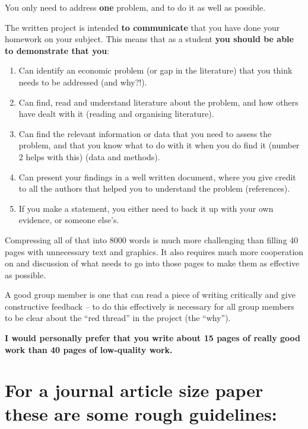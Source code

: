 \documentclass[
]{book}
\begin{document}
You only need to address \textbf{one} problem, and to do it as well as
possible.

The written project is intended \textbf{to communicate} that you have done
your homework on your subject. This means that as a student \textbf{you should
be able to demonstrate that you}:

\begin{enumerate}
\def\labelenumi{\arabic{enumi}.}
\item
  Can identify an economic problem (or gap in the literature) that you
  think needs to be addressed (and why?!).
\item
  Can find, read and understand literature about the problem, and how
  others have dealt with it (reading and organising literature).
\item
  Can find the relevant information or data that you need to assess
  the problem, and that you know what to do with it when you do find
  it (number 2 helps with this) (data and methods).
\item
  Can present your findings in a well written document, where you give
  credit to all the authors that helped you to understand the
  problem (references).
\item
  If you make a statement, you either need to back it up with your own
  evidence, or someone else's.
\end{enumerate}

Compressing all of that into 8000 words is much more challenging than
filling 40 pages with unnecessary text and graphics. It also requires
much more cooperation on and discussion of what needs to go into those
pages to make them as effective as possible.

A good group member is one that can read a piece of writing critically
and give constructive feedback -- to do this effectively is necessary
for all group members to be clear about the ``red thread'' in the project
(the ``why'').

\textbf{I would personally prefer that you write about 15 pages of really good
work than 40 pages of low-quality work.}

\hypertarget{for-a-journal-article-size-paper-these-are-some-rough-guidelines}{%
\section{For a journal article size paper these are some rough guidelines:}\label{for-a-journal-article-size-paper-these-are-some-rough-guidelines}}
\end{document}
